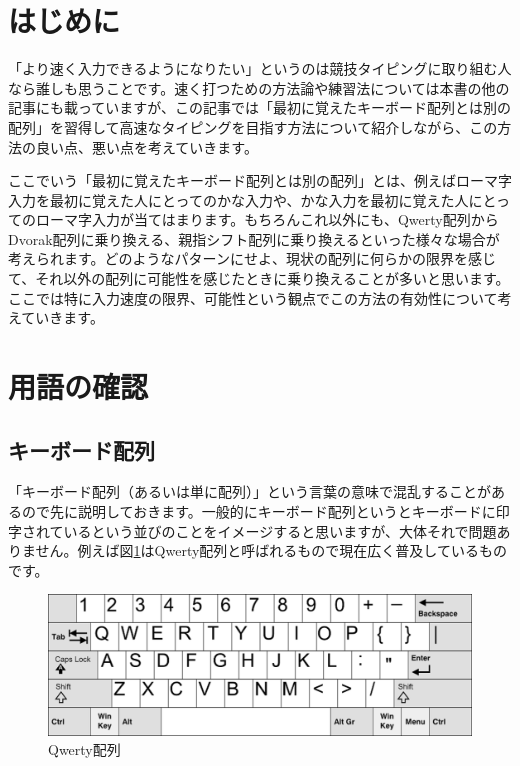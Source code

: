
\section{はじめに}

「より速く入力できるようになりたい」というのは競技タイピングに取り組む人なら誰しも思うことです。速く打つための方法論や練習法については本書の他の記事にも載っていますが、この記事では「最初に覚えたキーボード配列とは別の配列」を習得して高速なタイピングを目指す方法について紹介しながら、この方法の良い点、悪い点を考えていきます。

ここでいう「最初に覚えたキーボード配列とは別の配列」とは、例えばローマ字入力を最初に覚えた人にとってのかな入力や、かな入力を最初に覚えた人にとってのローマ字入力が当てはまります。もちろんこれ以外にも、Qwerty配列からDvorak配列に乗り換える、親指シフト配列に乗り換えるといった様々な場合が考えられます。どのようなパターンにせよ、現状の配列に何らかの限界を感じて、それ以外の配列に可能性を感じたときに乗り換えることが多いと思います。ここでは特に入力速度の限界、可能性という観点でこの方法の有効性について考えていきます。

\section{用語の確認}

\subsection{キーボード配列}

「キーボード配列（あるいは単に配列）」という言葉の意味で混乱することがあるので先に説明しておきます。一般的にキーボード配列というとキーボードに印字されているという並びのことをイメージすると思いますが、大体それで問題ありません。例えば図\ref{qwerty}はQwerty配列と呼ばれるもので現在広く普及しているものです。


\begin{figure}
 \begin{center}
   \includegraphics[width=14cm,clip]{res_tomoemon/qwerty.eps}
 \end{center}
 \caption{Qwerty配列}
 \label{qwerty}
\end{figure}

